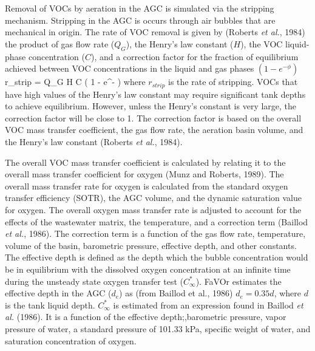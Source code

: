 
Removal of VOCs by aeration in the AGC is simulated via the stripping
mechanism.  Stripping in the AGC is occurs through air bubbles that are
mechanical in origin.  The rate of VOC removal is given by (Roberts {\it et
al.}, 1984) the product of gas flow rate ($Q_G$), the Henry's law constant
($H$), the VOC liquid-phase concentration ($C$), and a correction factor for
the fraction of equilibrium achieved between VOC concentrations in the liquid
and gas phases $(1 - e^{- \phi})$ 
\mb
r_{strip} = Q_G H C \left( 1 - e^{- \phi} \right)
\mef
where $r_{strip}$ is the rate of stripping.  VOCs that have high values of the
Henry's law constant may require significant tank depths to achieve
equilibrium.  However, unless the Henry's constant is very large, the
correction factor will be close to 1.  The correction factor is based on the
overall VOC mass transfer coefficient, the gas flow rate, the aeration basin
volume, and the Henry's law constant (Roberts {\it et al.}, 1984).  

The overall VOC mass transfer coefficient is calculated by relating it to the
overall mass transfer coefficient for oxygen (Munz and Roberts, 1989).  The
overall mass transfer rate for oxygen is calculated from the standard oxygen
transfer efficiency (SOTR), the AGC volume, and the dynamic saturation value
for oxygen.  The overall oxygen mass transfer rate is adjusted to account for
the effects of the wastewater matrix, the temperature, and a correction term
(Baillod  {\it et al.}, 1986). The correction term is a function of the gas
flow rate, temperature, volume of the basin, barometric pressure, effective
depth, and other constants.  The effective depth is defined as the depth which
the bubble concentration would be in equilibrium with the dissolved oxygen
concentration at an infinite time during the unsteady state oxygen transfer
test ($C_{\infty}^{\ast}$).  FaVOr estimates the effective depth in the AGC
($d_e$) as (from Baillod et al., 1986) $ d_e = 0.35 d $, where $d$ is the tank
liquid depth.  $C_{\infty}^{\ast}$ is estimated from an expression found in
Baillod {\it et al.} (1986).  It is a function of the effective
depth;,barometric pressure, vapor pressure of water, a standard pressure of
101.33 kPa, specific weight of water, and saturation concentration of oxygen.



